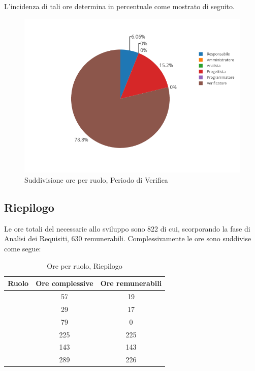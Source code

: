 L'incidenza di tali ore determina in percentuale come mostrato di seguito.
\begin{figure}[H]
	\centering
	\includegraphics[scale=0.6]{img/Validazione.png}
	\caption{Suddivisione ore per ruolo, Periodo di Verifica}
\end{figure}

\subsection{Riepilogo}
Le ore totali del necessarie allo sviluppo sono 822 di cui, scorporando la fase di Analisi dei Requisiti, 630 remunerabili. Complessivamente le ore sono suddivise come segue:

\begin{table}[H]
	\begin{center}
		\begin{tabular}{|c|c|c|}
			\hline
			\textbf{Ruolo}	& \textbf{Ore complessive} & \textbf{Ore remunerabili} \\
			\hline
			\Res	&	57	&	19	\\
			\hline
			\Amm	&	29	&	17	\\
			\hline
			\Ana	&	79	&	0	\\
			\hline
			\Prog	&	225	&	225	\\
			\hline
			\Progr	&	143	&	143	\\
			\hline
			\Ver	&	289	&	226	\\
			\hline
		\end{tabular}
	\end{center}
	\caption{Ore per ruolo, Riepilogo}
\end{table}

